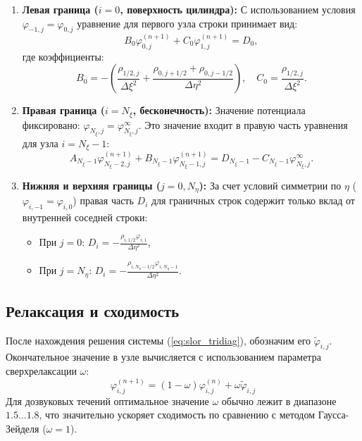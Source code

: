 \documentclass[a4paper,12pt]{article}
\begin{document}
	\begin{enumerate}
		\item \textbf{Левая граница ($i=0$, поверхность цилиндра):} 
		С использованием условия $\varphi_{-1,j} = \varphi_{0,j}$ уравнение для первого узла строки принимает вид:
		\[ B_0 \varphi_{0,j}^{(n+1)} + C_0 \varphi_{1,j}^{(n+1)} = D_0, \]
		где коэффициенты:
		\[ B_0 = -\left( \frac{\rho_{1/2,j}}{\Delta \xi^2} + \frac{\rho_{0,j+1/2} + \rho_{0,j-1/2}}{\Delta \eta^2} \right), \quad C_0 = \frac{\rho_{1/2,j}}{\Delta \xi^2}. \]
		
		\item \textbf{Правая граница ($i=N_\xi$, бесконечность):} 
		Значение потенциала фиксировано: $\varphi_{N_\xi,j} = \varphi_{N_\xi,j}^\infty$. Это значение входит в правую часть уравнения для узла $i=N_\xi-1$:
		\[ A_{N_\xi-1} \varphi_{N_\xi-2,j}^{(n+1)} + B_{N_\xi-1} \varphi_{N_\xi-1,j}^{(n+1)} = D_{N_\xi-1} - C_{N_\xi-1} \varphi_{N_\xi,j}^\infty. \]
		
		\item \textbf{Нижняя и верхняя границы ($j=0, N_\eta$):} 
		За счет условий симметрии по $\eta$ ($\varphi_{i,-1} = \varphi_{i,0}$) правая часть $D_i$ для граничных строк содержит только вклад от внутренней соседней строки:
		\begin{itemize}
			\item При $j=0$: $D_i = \displaystyle - \frac{\rho_{i,1/2} \varphi_{i,1}}{\Delta \eta^2}$,
			\item При $j=N_\eta$: $D_i = \displaystyle - \frac{\rho_{i,N_\eta-1/2} \varphi_{i,N_\eta-1}}{\Delta \eta^2}$.
		\end{itemize}
	\end{enumerate}


	\subsection{Релаксация и сходимость}
	
	После нахождения решения системы (\ref{eq:slor_tridiag}), обозначим его $\tilde{\varphi}_{i,j}$. Окончательное значение в узле вычисляется с использованием параметра сверхрелаксации $\omega$:
	\begin{equation}
		\varphi_{i,j}^{(n+1)} = (1 - \omega) \varphi_{i,j}^{(n)} + \omega \tilde{\varphi}_{i,j}
	\end{equation}
	Для дозвуковых течений оптимальное значение $\omega$ обычно лежит в диапазоне $1.5 \dots 1.8$, что значительно ускоряет сходимость по сравнению с методом Гаусса-Зейделя ($\omega = 1$).
\end{document}
